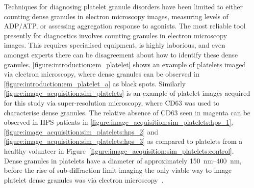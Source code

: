 Techniques for diagnosing platelet granule disorders have been limited to either counting dense granules in electron microscopy images, measuring levels of ADP/ATP, or assessing aggregation response to agonists. The most reliable tool presently for diagnostics involves counting granules in electron microscopy images. This requires specialised equipment, is highly laborious, and even amongst experts there can be disagreement about how to identify these dense granules. \autoref{figure:introduction:em_platelet} shows an example of platelets imaged via electron microscopy, where dense granules can be observed in \autoref{figure:introduction:em_platelet_a} as black spots. Similarly \autoref{figure:image_acquisition:sim_platelets} is an example of platelet images acquired for this study via super-resolution microscopy, where CD63 was used to characterise dense granules. The relative absence of CD63 seen in magenta can be observed in HPS patients in \autoref{figure:image_acquisition:sim_platelets:hps_1}, \autoref{figure:image_acquisition:sim_platelets:hps_2} and \autoref{figure:image_acquisition:sim_platelets:hps_3} as compared to platelets from a healthy volunteer in Figure~\autoref{figure:image_acquisition:sim_platelets:control}. Dense granules in platelets have a diameter of approximately \SIrange{150}{400}{\nano\meter}, before the rise of sub-diffraction limit imaging the only viable way to image platelet dense granules was via electron microscopy~\cite{Rumbaut2010}.

